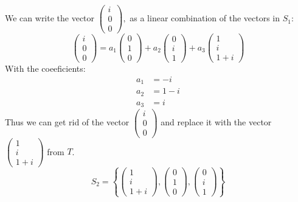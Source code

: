\documentclass{article}
\begin{document}
We can write the vector \(
   \begin{pmatrix}
      i \\
      0 \\
      0
   \end{pmatrix},
\) as a linear combination of the vectors in \(S_1\):
\[
   \begin{pmatrix}
      i \\
      0 \\
      0
   \end{pmatrix} = a_1 \begin{pmatrix}
      0 \\
      1 \\
      0
   \end{pmatrix} + a_2 \begin{pmatrix}
      0 \\
      i \\
      1
   \end{pmatrix} + a_3 \begin{pmatrix}
      1 \\
      i \\
      1 + i
   \end{pmatrix}
\]
With the coeeficients:
\begin{align*}
   a_1 &= -i \\
   a_2 &= 1-i \\
   a_3 &= i
\end{align*}
Thus we can get rid of the vector \(
   \begin{pmatrix}
      i \\
      0 \\
      0
   \end{pmatrix}
\) and replace it with the vector \(
   \begin{pmatrix}
      1 \\
      i \\
      1 + i
   \end{pmatrix}
\) from \(T\).
\[
   S_2 = \left\{
      \begin{pmatrix}
         1 \\
         i \\
         1 + i
      \end{pmatrix},
      \begin{pmatrix}
         0 \\
         1 \\
         0
      \end{pmatrix},
      \begin{pmatrix}
         0 \\
         i \\
         1
      \end{pmatrix}
   \right\}
\]
\end{document}
